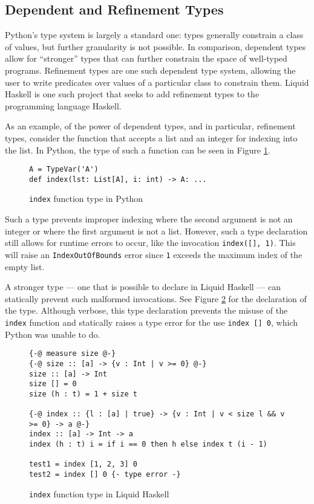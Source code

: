 \documentclass{article}
\begin{document}
\subsection{Dependent and Refinement Types}

Python's type system is largely a standard one: types generally constrain a class of values, but further granularity is not possible. In comparison, dependent types allow for ``stronger'' types that can further constrain the space of well-typed programs. Refinement types are one such dependent type system, allowing the user to write predicates over values of a particular class to constrain them. Liquid Haskell is one such project that seeks to add refinement types to the programming language Haskell.

As an example, of the power of dependent types, and in particular, refinement types, consider the function that accepts a list and an integer for indexing into the list. In Python, the type of such a function can be seen in Figure \ref{python-type-indexing}.

\begin{figure}
\centering
\begin{verbatim}
A = TypeVar('A')
def index(lst: List[A], i: int) -> A: ... \end{verbatim}
\caption{\texttt{index} function type in Python}
\label{python-type-indexing}
\end{figure}
Such a type prevents improper indexing where the second argument is not an integer or where the first argument is not a list. However, such a type declaration still allows for runtime errors to occur, like the invocation \texttt{index([], 1)}. This will raise an \texttt{IndexOutOfBounds} error since \texttt{1} exceeds the maximum index of the empty list.

A stronger type --- one that is possible to declare in Liquid Haskell --- can statically prevent such malformed invocations. See Figure \ref{lh-type-indexing} for the declaration of the type. Although verbose, this type declaration prevents the misuse of the \texttt{index} function and statically raises a type error for the use \texttt{index [] 0}, which Python was unable to do.

\begin{figure}
    \centering
    \begin{verbatim}
{-@ measure size @-}
{-@ size :: [a] -> {v : Int | v >= 0} @-}
size :: [a] -> Int
size [] = 0
size (h : t) = 1 + size t

{-@ index :: {l : [a] | true} -> {v : Int | v < size l && v >= 0} -> a @-}
index :: [a] -> Int -> a
index (h : t) i = if i == 0 then h else index t (i - 1)

test1 = index [1, 2, 3] 0
test2 = index [] 0 {- type error -}\end{verbatim}
    \caption{\texttt{index} function type in Liquid Haskell}
    \label{lh-type-indexing}
\end{figure}
\end{document}
